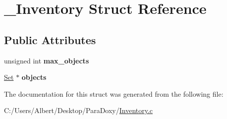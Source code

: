\hypertarget{struct___inventory}{\section{\-\_\-\-Inventory Struct Reference}
\label{struct___inventory}
}
\subsection*{Public Attributes}
\begin{DoxyCompactItemize}
\item 
\hypertarget{struct___inventory_a5260450568d1d2fd34dc7d9ab229ef67}{unsigned int {\bfseries max\-\_\-objects}}\label{struct___inventory_a5260450568d1d2fd34dc7d9ab229ef67}

\item 
\hypertarget{struct___inventory_a478e4b50a62b9e7d5b17e335319faa97}{\hyperlink{struct___set}{Set} $\ast$ {\bfseries objects}}\label{struct___inventory_a478e4b50a62b9e7d5b17e335319faa97}

\end{DoxyCompactItemize}


The documentation for this struct was generated from the following file\-:\begin{DoxyCompactItemize}
\item 
C\-:/\-Users/\-Albert/\-Desktop/\-Para\-Doxy/\hyperlink{_inventory_8c}{Inventory.\-c}\end{DoxyCompactItemize}
